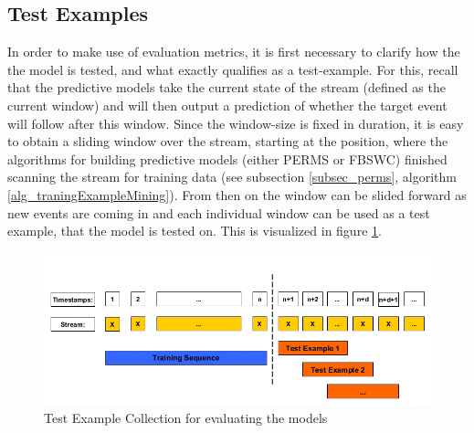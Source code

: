 \subsection{Test Examples}
In order to make use of evaluation metrics, it is first necessary to clarify how the the model is tested, and what exactly qualifies as a test-example. For this, recall that the predictive models take the current state of the stream (defined as the current window) and will then output a prediction of whether the target event will follow after this window. Since the window-size is fixed in duration, it is easy to obtain a sliding window over the stream, starting at the position, where the algorithms for building predictive models (either PERMS or FBSWC) finished scanning the stream for training data (see subsection \ref{subsec_perms}, algorithm \ref{alg_traningExampleMining}). From then on the window can be slided forward as new events are coming in and each individual window can be used as a test example, that the model is tested on. This is visualized in figure \ref{fig_testData}.

\begin{figure}[h]
	\centering
  	\includegraphics[width=\textwidth]{testData}
	\caption[Test Example Collection]{Test Example Collection for evaluating the models}
	\label{fig_testData}
\end{figure}

